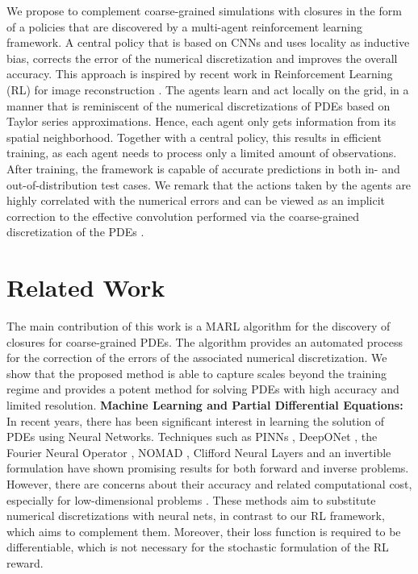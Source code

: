 \documentclass{article}
\theoremstyle{plain}
\theoremstyle{definition}
\theoremstyle{remark}
\begin{document}
We propose to complement coarse-grained simulations with closures in the form of a policies that are discovered by a multi-agent reinforcement learning framework. A central policy that is based on CNNs and uses locality as inductive bias,  corrects the error of the numerical discretization and improves the overall accuracy. This approach is inspired by recent work in Reinforcement Learning (RL) for image reconstruction \cite{cv_pixel_rl}. The agents learn and act locally on the grid, in a manner that is reminiscent of the numerical discretizations of PDEs based on Taylor series approximations. Hence, each agent only gets information from its spatial neighborhood. Together with a central policy, this results in efficient training, as each agent needs to process only a limited amount of observations. After training, the framework is capable of accurate predictions in both in- and out-of-distribution test cases. We remark  that the actions taken by the agents are highly correlated with the numerical errors and can be viewed as an implicit correction to the effective convolution performed via  the coarse-grained discretization of the  PDEs \cite{bergdorf2005multilevel}.  \\

\section{Related Work}
The main contribution of this work is a MARL algorithm for the discovery of closures for coarse-grained PDEs. The algorithm provides an automated process for the correction of the errors of the associated numerical discretization. We  show that the proposed method is able to capture scales beyond the training regime and provides a potent method for solving PDEs with high accuracy and limited resolution.
\newpage
\textbf{Machine Learning and Partial Differential Equations:}
In recent years, there has been significant interest in learning the solution of PDEs using Neural Networks. Techniques such as 
PINNs \cite{raissi2019physics,karniadakis2021physics}, DeepONet \cite{lu2021learning}, the Fourier Neural Operator \cite{li2020fourier}, NOMAD \cite{seidman2022nomad}, Clifford Neural Layers \cite{brandstetter2022clifford} and an invertible formulation \cite{kaltenbach2023semi} have shown promising results for both forward and inverse problems. However, there are concerns about their accuracy and related computational cost, especially for low-dimensional problems \cite{karnakov2022optimizing}. These methods aim to substitute numerical discretizations with neural nets, in contrast to our RL framework, which aims to complement them. Moreover, their loss function is required to be differentiable, which is not necessary for the stochastic formulation of the RL reward.
\end{document}
